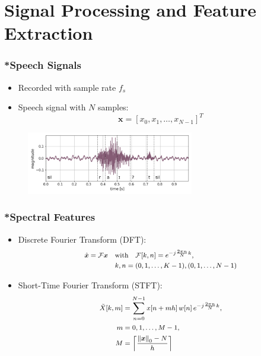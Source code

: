 
\section{Signal Processing and Feature Extraction}
\begin{frame}
  \frametitle{*Speech Signals}
  \begin{itemize}
    \item Recorded with sample rate $f_s$
    \item Speech signal with $N$ samples:
    \begin{equation*}\label{eq:signal_raw_x}
      \bm{x} = [x_0, x_1, \dots, x_{N-1}]^T
    \end{equation*}
  \end{itemize}
  \begin{figure} \includegraphics[width=0.65\textwidth]{../3_signal/figs/signal_raw_showcase_right0.png} \end{figure}
\end{frame}

\begin{frame}
  \frametitle{*Spectral Features}
  \begin{itemize}
    \item Discrete Fourier Transform (DFT):
    \begin{equation*}\label{eq:signal_spec_dtft_matrix}
      \footnotesize
      \begin{aligned}
        \hat{\bm{x}} = \mathcal{F} \bm{x} \quad & \mathrm{with} 
        \quad \mathcal{F}[k, n] = e^{-j\frac{2 \pi n}{N} k},\\
        &k, n = (0, 1, \dots, K-1), (0, 1, \dots, N-1)
      \end{aligned}
    \end{equation*}

    \item Short-Time Fourier Transform (STFT):
    \begin{equation*}\label{eq:signal_spec_stft}
      \footnotesize
      \begin{aligned}
        \tilde{X}[k, m] &= \sum_{n=0}^{N-1} x[n + m h] \, w[n] \, e^{-j\frac{2 \pi n}{N}k},\\ 
        m &= 0, 1, \dots, M - 1,\\
        M &= \ceil*{\frac{\norm{\bm{x}}_0-N}{h}}
      \end{aligned}
    \end{equation*}
  \end{itemize}
\end{frame}

